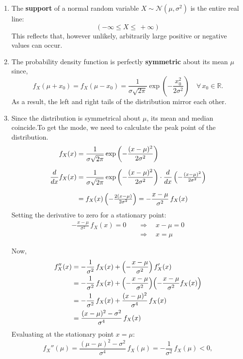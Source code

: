 \documentclass[twoside]{book}
\begin{document}
\begin{enumerate}
  \item The \textbf{support} of a normal random variable \(X \sim \mathcal{N}(\mu,\sigma^2)\) is the entire real line:
    \[
	(-\infty \leq X \leq\,+\infty)
    \]
    This reflects that, however unlikely, arbitrarily large positive or negative values can occur.

  \item The probability density function is perfectly \textbf{symmetric} about its mean \(\mu\) since,
    \[
      f_X(\mu + x_0) = f_X(\mu - x_0) =  \frac{1}{\sigma\sqrt{2\pi }} \exp\left( -\frac{x_0^2}{2\sigma^2} \right)
      \quad\forall\,x_0\in\mathbb{R}.
    \]
    As a result, the left and right tails of the distribution mirror each other.

  \item Since the distribution is symmetrical about $\mu$, its mean and median coincide.To get the mode, we need to calculate the peak point of the distribution.
  \begin{align*}
  f_X(x) &= \frac{1}{\sigma\sqrt{2\pi}} \exp\left( -\frac{(x-\mu)^2}{2\sigma^2}\right)  \\[6pt]
  \frac{d}{dx}f_X(x)
  &= \frac{1}{\sigma\sqrt{2\pi}} \exp\left( -\frac{(x-\mu)^2}{2\sigma^2}\right)
     \cdot \frac{d}{dx}\left( -\tfrac{(x-\mu)^2}{2\sigma^2}\right)  \\[6pt]
  &= f_X(x)\,\Bigl(-\tfrac{2(x-\mu)}{2\sigma^2}\Bigr)
  = -\frac{x-\mu}{\sigma^2}\,f_X(x)
  \end{align*}
  Setting the derivative to zero for a stationary point:
  \begin{align*}
  -\frac{x-\mu}{\sigma^2}\,f_X(x) = 0
  \quad &\Longrightarrow\quad x - \mu = 0 \\[4pt]
  &\Longrightarrow\quad x = \mu
  \end{align*}

  Now,
  \begin{align*}
  f_X''(x)
  &= -\frac{1}{\sigma^2}\,f_X(x)
     + \Bigl(-\frac{x-\mu}{\sigma^2}\Bigr)\,f_X'(x)
  \\
  &= -\frac{1}{\sigma^2}\,f_X(x)
     + \Bigl(-\frac{x-\mu}{\sigma^2}\Bigr)\Bigl(-\frac{x-\mu}{\sigma^2}f_X(x)\Bigr)
  \\
  &= -\frac{1}{\sigma^2}\,f_X(x)
     + \frac{(x-\mu)^2}{\sigma^4}\,f_X(x)
  \\
  &= \frac{(x-\mu)^2 - \sigma^2}{\sigma^4}\,f_X(x)
  \end{align*}
  Evaluating at the stationary point \(x=\mu\):
  \[
  f_X''(\mu)
  = \frac{(\mu-\mu)^2 - \sigma^2}{\sigma^4}\,f_X(\mu)
  = -\frac{1}{\sigma^2}\,f_X(\mu)
  < 0,
  \]


\end{enumerate}
\end{document}
